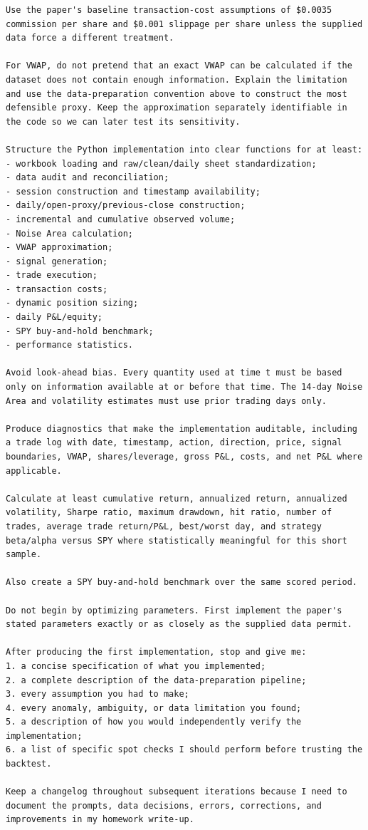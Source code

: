 \documentclass{article}
\begin{document}
\begin{lstlisting}
Use the paper's baseline transaction-cost assumptions of $0.0035 commission per share and $0.001 slippage per share unless the supplied data force a different treatment.

For VWAP, do not pretend that an exact VWAP can be calculated if the dataset does not contain enough information. Explain the limitation and use the data-preparation convention above to construct the most defensible proxy. Keep the approximation separately identifiable in the code so we can later test its sensitivity.

Structure the Python implementation into clear functions for at least:
- workbook loading and raw/clean/daily sheet standardization;
- data audit and reconciliation;
- session construction and timestamp availability;
- daily/open-proxy/previous-close construction;
- incremental and cumulative observed volume;
- Noise Area calculation;
- VWAP approximation;
- signal generation;
- trade execution;
- transaction costs;
- dynamic position sizing;
- daily P&L/equity;
- SPY buy-and-hold benchmark;
- performance statistics.

Avoid look-ahead bias. Every quantity used at time t must be based only on information available at or before that time. The 14-day Noise Area and volatility estimates must use prior trading days only.

Produce diagnostics that make the implementation auditable, including a trade log with date, timestamp, action, direction, price, signal boundaries, VWAP, shares/leverage, gross P&L, costs, and net P&L where applicable.

Calculate at least cumulative return, annualized return, annualized volatility, Sharpe ratio, maximum drawdown, hit ratio, number of trades, average trade return/P&L, best/worst day, and strategy beta/alpha versus SPY where statistically meaningful for this short sample.

Also create a SPY buy-and-hold benchmark over the same scored period.

Do not begin by optimizing parameters. First implement the paper's stated parameters exactly or as closely as the supplied data permit.

After producing the first implementation, stop and give me:
1. a concise specification of what you implemented;
2. a complete description of the data-preparation pipeline;
3. every assumption you had to make;
4. every anomaly, ambiguity, or data limitation you found;
5. a description of how you would independently verify the implementation;
6. a list of specific spot checks I should perform before trusting the backtest.

Keep a changelog throughout subsequent iterations because I need to document the prompts, data decisions, errors, corrections, and improvements in my homework write-up.
\end{lstlisting}
\end{document}
